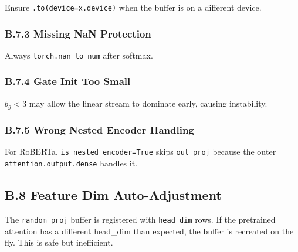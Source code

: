 Ensure \texttt{.to(device=x.device)} when the buffer is on a different device.

\subsubsection{B.7.3 Missing NaN Protection}

Always \texttt{torch.nan\_to\_num} after softmax.

\subsubsection{B.7.4 Gate Init Too Small}

$b_g < 3$ may allow the linear stream to dominate early, causing instability.

\subsubsection{B.7.5 Wrong Nested Encoder Handling}

For RoBERTa, \texttt{is\_nested\_encoder=True} skips \texttt{out\_proj} because the outer 
\texttt{attention.output.dense} handles it.

\subsection{B.8 Feature Dim Auto-Adjustment}

The \texttt{random\_proj} buffer is registered with \texttt{head\_dim} rows. If the 
pretrained attention has a different head\_dim than expected, the buffer is 
recreated on the fly. This is safe but inefficient.

